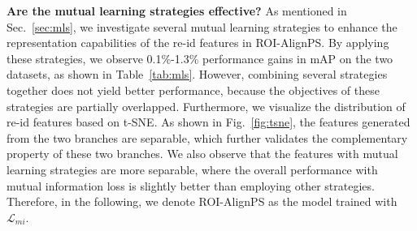 \documentclass[journal]{IEEEtran}
\begin{document}
\textbf{Are the mutual learning strategies effective?}
As mentioned in Sec.~\ref{sec:mls}, we investigate several mutual learning strategies to enhance the representation capabilities of the re-id features in ROI-AlignPS. By applying these strategies, we observe 0.1\%-1.3\% performance gains in mAP on the two datasets, as shown in Table~\ref{tab:mls}. However, combining several strategies together does not yield better performance, because the objectives of these strategies are partially overlapped. Furthermore, we visualize the distribution of re-id features based on t-SNE. As shown in Fig.~\ref{fig:tsne}, the features generated from the two branches are separable, which further validates the complementary property of these two branches. We also observe that the features with mutual learning strategies are more separable, where the overall performance with mutual information loss is slightly better than employing other strategies. Therefore, in the following, we denote ROI-AlignPS as the model trained with $\mathcal{L}_{mi}$. 
\end{document}
